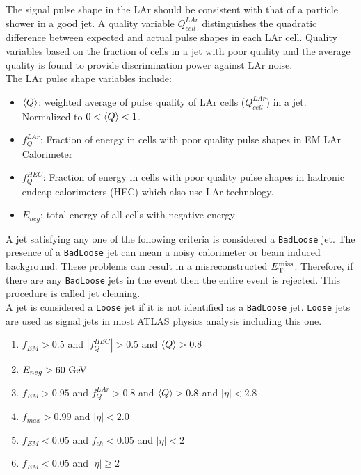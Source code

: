 \indent The signal pulse shape in the LAr should be consistent with that of a particle shower in a good jet.  A quality variable $Q^{LAr}_{cell}$ distinguishes the quadratic difference between expected and actual pulse shapes in each LAr cell.  Quality variables based on the fraction of cells in a jet with poor quality and the average quality is found to provide discrimination power against LAr noise. \\

\indent The LAr pulse shape variables include: \\

\begin{itemize}
\item[] $\braket{Q}$: weighted average of pulse quality of LAr cells ($Q^{LAr}_{cell}$) in a jet.  Normalized to $0 < \braket{Q} < 1$.
\item[] $f^{LAr}_{Q}$: Fraction of energy in cells with poor quality pulse shapes in EM LAr Calorimeter
\item[] $f^{HEC}_{Q}$: Fraction of energy in cells with poor quality pulse shapes in hadronic endcap calorimeters (HEC) which also use LAr technology.
\item[] $E_{neg}$: total energy of all cells with negative energy
\end{itemize}

\indent A jet satisfying any one of the following criteria is considered a {\tt BadLoose} jet.  The presence of a {\tt BadLoose} jet can mean a noisy calorimeter or beam induced background.  These problems can result in a misreconstructed $E_{\mathrm{T}}^{\mathrm{miss}}$.  Therefore, if there are any {\tt BadLoose} jets in the event then the entire event is rejected.   This procedure is called jet cleaning.  \\

\indent A jet is considered a {\tt Loose} jet if it is not identified as a {\tt BadLoose} jet.  {\tt Loose} jets are used as signal jets in most ATLAS physics analysis including this one. \\

\begin{enumerate}
\item[] $f_{EM} > 0.5$ and $|f^{HEC}_{Q}| > 0.5$ and $\braket{Q} > 0.8$
\item[] $E_{neg} > 60 \gev$
\item[] $f_{EM} > 0.95$ and $f^{LAr}_{Q} > 0.8$ and $\braket{Q}>0.8$ and $|\eta|<2.8$
\item[] $f_{max}>0.99$ and $|\eta|<2.0$
\item[] $f_{EM}<0.05$ and $f_{ch}<0.05$ and $|\eta|<2$
\item[] $f_{EM}<0.05$ and $|\eta|\ge2$
\end{enumerate}

